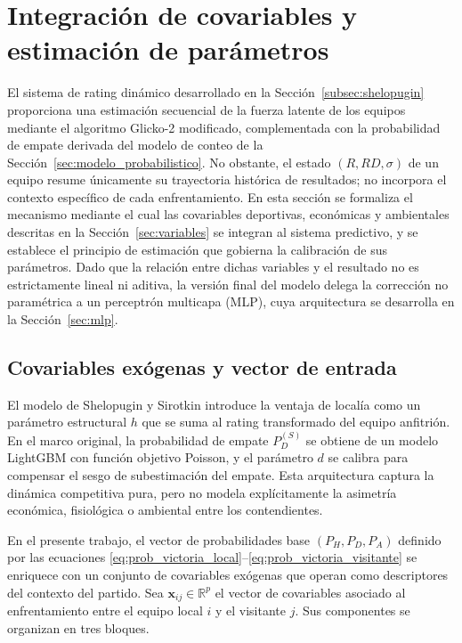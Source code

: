 
\section{Integraci\'on de covariables y estimaci\'on de par\'ametros}
\label{sec:regresion}

El sistema de rating din\'amico desarrollado en la Secci\'on~\ref{subsec:shelopugin} proporciona una estimaci\'on secuencial de la fuerza latente de los equipos mediante el algoritmo Glicko-2 modificado, complementada con la probabilidad de empate derivada del modelo de conteo de la Secci\'on~\ref{sec:modelo_probabilistico}. No obstante, el estado $(R,RD,\sigma)$ de un equipo resume \'unicamente su trayectoria hist\'orica de resultados; no incorpora el contexto espec\'ifico de cada enfrentamiento. En esta secci\'on se formaliza el mecanismo mediante el cual las covariables deportivas, econ\'omicas y ambientales descritas en la Secci\'on~\ref{sec:variables} se integran al sistema predictivo, y se establece el principio de estimaci\'on que gobierna la calibraci\'on de sus par\'ametros. Dado que la relaci\'on entre dichas variables y el resultado no es estrictamente lineal ni aditiva, la versi\'on final del modelo delega la correcci\'on no param\'etrica a un perceptr\'on multicapa (MLP), cuya arquitectura se desarrolla en la Secci\'on~\ref{sec:mlp}.

\subsection{Covariables ex\'ogenas y vector de entrada}
\label{subsec:covariables}

El modelo de Shelopugin y Sirotkin \cite{Glicko2Mod} introduce la ventaja de local\'ia como un par\'ametro estructural $h$ que se suma al rating transformado del equipo anfitri\'on. En el marco original, la probabilidad de empate  $P_D^{(S)}$ se obtiene de un modelo LightGBM con funci\'on objetivo Poisson, y el par\'ametro $d$ se calibra para compensar el sesgo de subestimaci\'on del empate. Esta arquitectura captura la din\'amica competitiva pura, pero no modela expl\'icitamente la asimetr\'ia econ\'omica, fisiol\'ogica o ambiental entre los contendientes.

En el presente trabajo, el vector de probabilidades base $(P_H, P_D, P_A)$ definido por las ecuaciones \eqref{eq:prob_victoria_local}--\eqref{eq:prob_victoria_visitante} se enriquece con un conjunto de covariables ex\'ogenas que operan como descriptores del contexto del partido. Sea $\mathbf{x}_{ij} \in \mathbb{R}^p$ el vector de covariables asociado al enfrentamiento entre el equipo local $i$ y el visitante $j$. Sus componentes se organizan en tres bloques.

